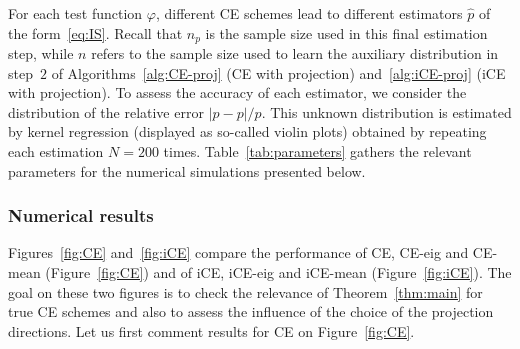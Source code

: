 \documentclass[]{article}
\newcommand{\nfin}{{n_p}}
\theoremstyle{plain}
\theoremstyle{definition}
\begin{document}
For each test function $\varphi$, different CE schemes lead to different estimators $\hat p$ of the form~\eqref{eq:IS}. Recall that $\nfin$ is the sample size used in this final estimation step, while $n$ refers to the sample size used to learn the auxiliary distribution in step~$2$ of Algorithms~\ref{alg:CE-proj} (CE with projection) and~\ref{alg:iCE-proj} (iCE with projection). To assess the accuracy of each estimator, we consider the distribution of the relative error $\lvert \hat p - p \rvert / p$. This unknown distribution is estimated by kernel regression (displayed as so-called violin plots) obtained by repeating each estimation $N = 200$ times. Table~\ref{tab:parameters} gathers the relevant parameters for the numerical simulations presented below.



\subsubsection{Numerical results}


Figures~\ref{fig:CE} and~\ref{fig:iCE} compare the performance of CE, CE-eig and CE-mean (Figure~\ref{fig:CE}) and of iCE, iCE-eig and iCE-mean (Figure~\ref{fig:iCE}). The goal on these two figures is to check the relevance of Theorem~\ref{thm:main} for true CE schemes and also to assess the influence of the choice of the projection directions. Let us first comment results for CE on Figure~\ref{fig:CE}.
\end{document}
